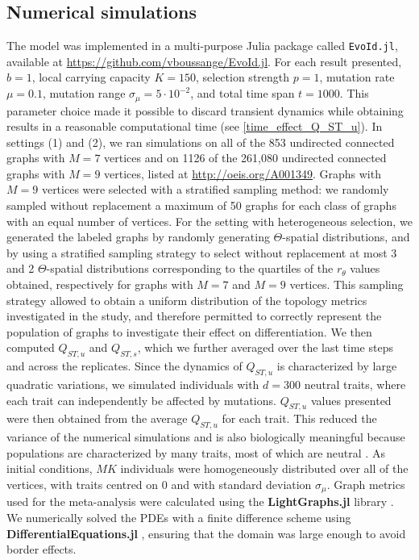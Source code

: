 \subsection{Numerical simulations}
The model was implemented in a multi-purpose Julia package called \texttt{EvoId.jl}, available at \href{https://github.com/vboussange/EvoId.jl}{https://github.com/vboussange/EvoId.jl}. For each result presented, $b = 1$, local carrying capacity $K = 150$, selection strength $p = 1$, mutation rate $\mu=0.1$, mutation range $\sigma_\mu = 5 \cdot 10^{-2}$, and total time span $t = 1000$. This parameter choice made it possible to discard transient dynamics while obtaining results in a reasonable computational time (see \cref{time_effect_Q_ST_u}).
%
In settings (1) and (2), we ran simulations on all of the 853 undirected connected graphs with $M=7$ vertices and on 1126 of the 261,080 undirected connected graphs with $M=9$ vertices, listed at \href{http://oeis.org/A001349}{http://oeis.org/A001349}. Graphs with $M = 9$ vertices were selected with a stratified sampling method: we randomly sampled without replacement a maximum of 50 graphs for each class of graphs with an equal number of vertices. For the setting with heterogeneous selection, we generated the labeled graphs by randomly generating $\Theta$-spatial distributions, and by using a stratified sampling strategy to select without replacement at most 3 and 2 $\Theta$-spatial distributions corresponding to the quartiles of the $r_\theta$ values obtained, respectively for graphs with $M=7$ and $M=9$ vertices. This sampling strategy allowed to obtain a uniform distribution of the topology metrics investigated in the study, and therefore permitted to correctly represent the population of graphs to investigate their effect on differentiation.
%
We then computed $Q_{ST,u}$ and $Q_{ST,s}$, which we further averaged over the last time steps and across the replicates.
%
Since the dynamics of $Q_{ST,u}$ is characterized by large quadratic variations, we simulated individuals with $d = 300$ neutral traits, where each trait can independently be affected by mutations. $Q_{ST,u}$ values presented were then obtained from the average $Q_{ST,u}$ for each trait. This reduced the variance of the numerical simulations and is also biologically meaningful because populations are characterized by many traits, most of which are neutral \citep{Holderegger2006}.
%
As initial conditions, $MK$ individuals were homogeneously distributed over all of the vertices, with traits centred on 0 and with standard deviation $\sigma_\mu$.
%
Graph metrics used for the meta-analysis were calculated using the \textbf{LightGraphs.jl} library \citep{Bromberger2017}. We numerically solved the PDEs with a finite difference scheme using \textbf{DifferentialEquations.jl} \citep{Rackauckas2017}, ensuring that the domain was large enough to avoid border effects.

